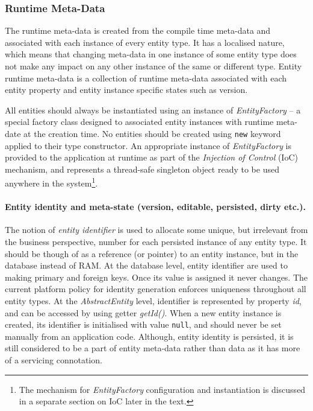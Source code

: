 \subsubsection{Runtime Meta-Data}

  The runtime meta-data is created from the compile time meta-data and associated with each instance of every entity type.
  It has a localised nature, which means that changing meta-data in one instance of some entity type does not make any impact on any other instance of the same or different type.
  Entity runtime meta-data is a collection of runtime meta-data associated with each entity property and entity instance specific states such as version.
  
  All entities should always be instantiated using an instance of \emph{EntityFactory} -- a special factory class designed to associated entity instances with runtime meta-date at the creation time.  
  No entities should be created using \texttt{new} keyword applied to their type constructor.
  An appropriate instance of \emph{EntityFactory} is provided to the application at runtime as part of the \emph{Injection of Control} (IoC) mechanism, and represents a thread-safe singleton object ready to be used anywhere in the system\footnote{The mechanism for \emph{EntityFactory} configuration and instantiation is discussed in a separate section on IoC later in the text.}.
  
  \paragraph*{Entity identity and meta-state (version, editable, persisted, dirty etc.).}

  The notion of \emph{entity identifier} is used to allocate some unique, but irrelevant from the business perspective, number for each persisted instance of any entity type.
  It should be though of as a reference (or pointer) to an entity instance, but in the database instead of RAM.
  At the database level, entity identifier are used to making primary and foreign keys.
  Once its value is assigned it never changes.
  The current platform policy for identity generation enforces uniqueness throughout all entity types.
  At the \emph{AbstractEntity} level, identifier is represented by property \emph{id}, and can be accessed by using getter \emph{getId()}.
  When a new entity instance is created, its identifier is initialised with value \texttt{null}, and should never be set manually from an application code.
  Although, entity identity is persisted, it is still considered to be a part of entity meta-data rather than data as it has more of a servicing connotation.

